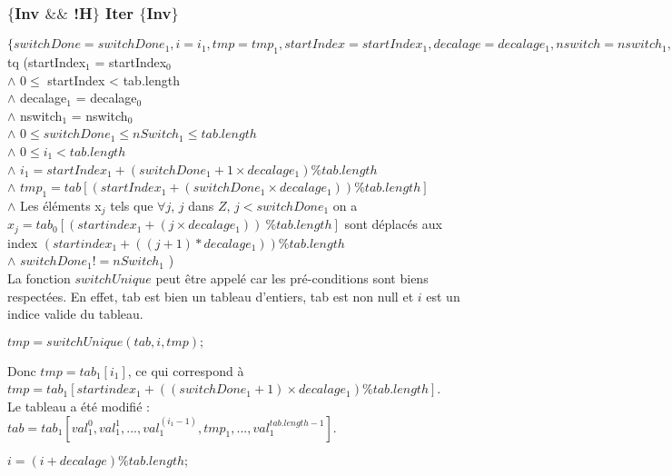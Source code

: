 \subsubsection*{$\{$Inv $\&\&$ !H$\}$ Iter $\{$Inv$\}$}

$\{ switchDone = switchDone_{1}, i = i_{1}, tmp = tmp_{1}, startIndex = startIndex_{1}, decalage = decalage_{1}, nswitch = nswitch_{1}, tab = tab_{1} \}$ tq (startIndex$_{1}$ = startIndex$_{0}$\\
$\wedge$ $0 \leq$ startIndex < tab.length \\
$\wedge$ decalage$_{1}$ = decalage$_{0}$\\
$\wedge$ nswitch$_{1}$ = nswitch$_{0}$\\
$\wedge$ $0\leq switchDone_{1} \leq nSwitch_{1} \leq tab.length$\\
$\wedge$ $0\leq i_{1} < tab.length$\\
$\wedge$ $i_{1} = startIndex_{1} + (switchDone_{1}+1\times decalage_{1}) \% tab.length$\\
$\wedge$ $tmp_{1} = tab[(startIndex_{1} + (switchDone_{1}\times decalage_{1}))  \% tab.length]$\\
$\wedge$ Les éléments x$_{j}$ tels que $\forall j$, $j$ dans $Z$, $j<switchDone_{1}$ on a $x_{j}=tab_{0}[(startindex_{1} + (j\times decalage_{1}))\ \% tab.length]$ sont déplacés aux index $(startindex_{1} + ((j+1)* decalage_{1}))\%tab.length$\\
$\wedge$ $switchDone_{1} != nSwitch_{1}$ )\\

La fonction $switchUnique$ peut être appelé car les pré-conditions sont biens respectées. En effet, tab est bien un tableau d'entiers, tab est non null et $i$ est un indice valide du tableau. \\

\begin{center}
$tmp = switchUnique(tab, i, tmp);$\\
\end{center}

Donc $tmp = tab_{1}[i_1]$, ce qui correspond à $tmp = tab_{1}[startindex_{1} + ((switchDone_{1}+1)\times decalage_{1}) \% tab.length]$.\\

Le tableau a été modifié : $tab = tab_{1}[val_{1}^{0},val_{1}^{1}, ..., val_{1}^{(i_{1}-1)}, tmp_{1}, ...,val_{1}^{tab.length-1}]$.\\

\begin{center}
  $i = (i+decalage) \% tab.length;$\\
 \end{center} 
 
